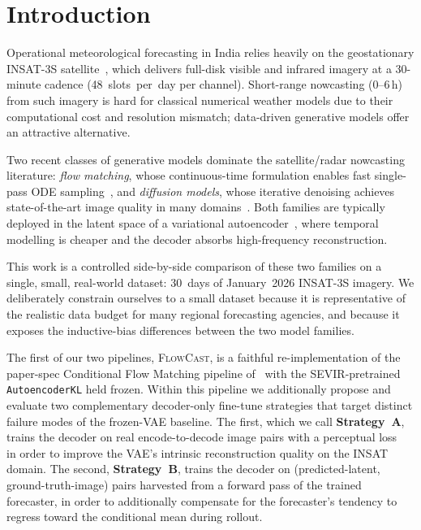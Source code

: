 \documentclass[11pt,a4paper]{article}
\begin{document}
\section{Introduction}
\label{sec:intro}

Operational meteorological forecasting in India relies heavily on the
geostationary {INSAT-3S} satellite~\citep{insat3s}, which delivers full-disk
visible and infrared imagery at a 30-minute cadence (48~slots~per~day per
channel). Short-range nowcasting (0--6\,h) from such imagery is hard for
classical numerical weather models due to their computational cost and
resolution mismatch; data-driven generative models offer an attractive
alternative.

Two recent classes of generative models dominate the satellite/radar
nowcasting literature: \emph{flow matching}, whose continuous-time
formulation enables fast single-pass ODE
sampling~\citep{lipman2023flowmatching, flowcast2026}, and \emph{diffusion
models}, whose iterative denoising achieves state-of-the-art image quality
in many domains~\citep{ho2020ddpm, karras2022edm, rombach2022ldm}. Both
families are typically deployed in the latent space of a variational
autoencoder~\citep{kingma2014vae}, where temporal modelling is cheaper and
the decoder absorbs high-frequency reconstruction.

This work is a controlled side-by-side comparison of these two families on
a single, small, real-world dataset: 30~days of January~2026 {INSAT-3S}
imagery. We deliberately constrain ourselves to a small dataset because it
is representative of the realistic data budget for many regional
forecasting agencies, and because it exposes the inductive-bias differences
between the two model families.

The first of our two pipelines, \textsc{FlowCast}, is a faithful
re-implementation of the paper-spec Conditional Flow Matching pipeline
of~\citet{flowcast2026} with the {SEVIR}-pretrained
\texttt{AutoencoderKL} held frozen. Within this pipeline we additionally
propose and evaluate two complementary decoder-only fine-tune strategies
that target distinct failure modes of the frozen-VAE baseline. The first,
which we call \textbf{Strategy~A}, trains the decoder on real
encode-to-decode image pairs with a perceptual loss~\citep{zhang2018lpips}
in order to improve the {VAE}'s intrinsic reconstruction quality on the
INSAT domain. The second, \textbf{Strategy~B}, trains the decoder on
(predicted-latent, ground-truth-image) pairs harvested from a forward pass
of the trained forecaster, in order to additionally compensate for the
forecaster's tendency to regress toward the conditional mean during
rollout.
\end{document}

